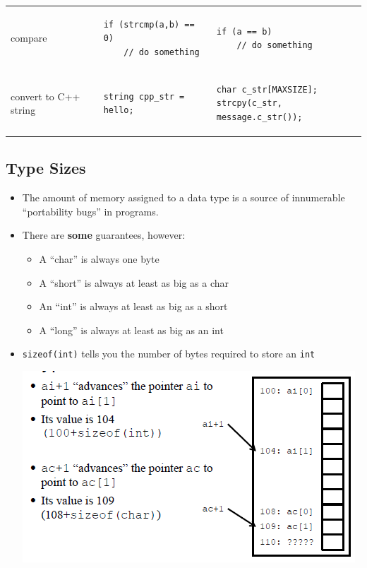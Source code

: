 \begin{center}
\begin{tabular}[breaklines=true]{p{5cm}|p{5cm}|p{5cm}}
	compare &
{\begin{lstlisting}[style=C++]
if (strcmp(a,b) == 0)
	// do something
\end{lstlisting}} &
{\begin{lstlisting}[style=C++]
if (a == b)
	// do something
\end{lstlisting}} \\
	convert to C++ string &
{\begin{lstlisting}[style=C++]
string cpp_str = hello;
\end{lstlisting}} &
{\begin{lstlisting}[style=C++]
char c_str[MAXSIZE];
strcpy(c_str, message.c_str());
\end{lstlisting}} \\
\end{tabular}
\end{center}

\subsection{Type Sizes}
\begin{itemize}
	\item The amount of memory assigned to a data type is a source of innumerable ``portability bugs'' in programs.
	\item There are \textbf{some} guarantees, however:
	\begin{itemize}
		\item A ``char'' is always one byte
		\item A ``short'' is always at least as big as a char
		\item An ``int'' is always at least as big as a short
		\item A ``long'' is always at least as big as an int
	\end{itemize}
	\item \lstinline[style=C++]{sizeof(int)} tells you the number of bytes required to store an \lstinline[style=C++]{int}
	\begin{center}
		\includegraphics{sections/lec7/type.png}
	\end{center}
\end{itemize}